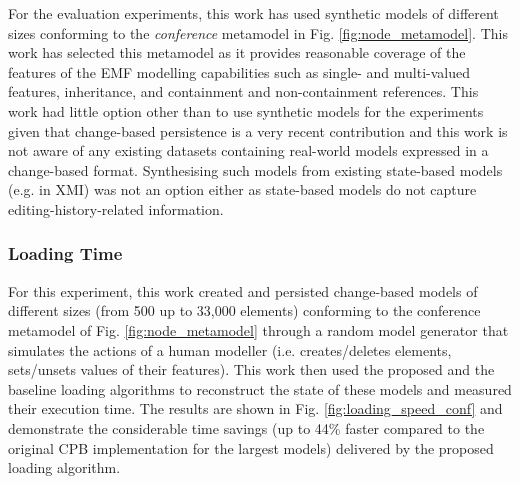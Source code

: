 \documentclass[12pt, a4paper]{report} \usepackage[titletoc]{appendix}
\begin{document}
For the evaluation experiments, this work has used synthetic models of different sizes conforming to the \emph{conference} metamodel in Fig. \ref{fig:node_metamodel}. This work has selected this metamodel as it provides reasonable coverage of the features of the EMF modelling capabilities such as single- and multi-valued features, inheritance, and containment and non-containment references. This work had little option other than to use synthetic models for the experiments given that change-based persistence is a very recent contribution and this work is not aware of any existing datasets containing real-world models expressed in a change-based format. Synthesising such models from existing state-based models (e.g. in XMI) was not an option either as state-based models do not capture editing-history-related information.    

\subsubsection{Loading Time}
\label{subsec:loading_time_test}

For this experiment, this work created and persisted change-based models of different sizes (from 500 up to 33,000 elements) conforming to the conference metamodel of Fig. \ref{fig:node_metamodel} through a random model generator that simulates the actions of a human modeller (i.e. creates/deletes elements, sets/unsets values of their features). This work then used the proposed and the baseline loading algorithms to reconstruct the state of these models and measured their execution time. The results are shown in Fig. \ref{fig:loading_speed_conf} and demonstrate the considerable time savings (up to 44\% faster compared to the original CPB implementation for the largest models) delivered by the proposed loading algorithm.
\end{document}
